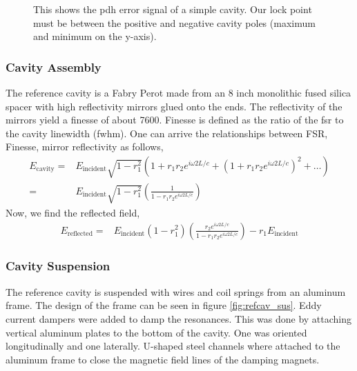 \begin{figure}
\centering
{}
\caption[PDH Error Signal]{This shows the \ac{pdh} error signal of a simple
  cavity.
  Our lock point must be between the positive and negative cavity poles
  (maximum  and minimum on the y-axis).
  }
\label{fig:pdh}
\end{figure}

\subsubsection{Cavity Assembly}

The reference cavity is a Fabry Perot made from an 8 inch monolithic fused silica
spacer with high reflectivity mirrors glued onto the ends. The reflectivity
of the mirrors yield a finesse of about 7600. Finesse is defined as the ratio
of the \ac{fsr} to the cavity linewidth (\ac{fwhm}). One can arrive the
relationships between FSR, Finesse, mirror reflectivity as follows,
\begin{align}
E_{\mathrm{cavity}} =& E_{\mathrm{incident}} \sqrt{1-r_1^2} \left( 1 + r_1 r_2
    e^{i \omega 2 L /c} + \left(1+r_1 r_2 e^{i \omega 2L/c} \right)^2 + \ldots \right)
    \\
=& E_{\mathrm{incident}} \sqrt{1-r_1^2} \left( \frac{1}{1 - r_1 r_2
    e^{i \omega 2L/c}} \right)
\end{align}
Now, we find the reflected field,
\begin{align}
E_{\mathrm{reflected}} =& E_{\mathrm{incident}} \left( 1-r_1^2 \right)
    \left( \frac{r_2 e^{i \omega 2L/c}}{1 - r_1 r_2 e^{i \omega 2L/c}} \right)
    - r_1 E_{\mathrm{incident}}
\end{align}

\subsubsection{Cavity Suspension}

The reference cavity is suspended with wires and coil springs from an aluminum
frame. The design of the frame can be seen in figure
\ref{fig:refcav_sus}.
Eddy current dampers were added to damp the resonances. This was done by
attaching vertical aluminum plates to the bottom of the cavity. One was
oriented longitudinally and one laterally.
U-shaped steel channels where attached to the aluminum frame to close the
magnetic field lines of the damping magnets.

